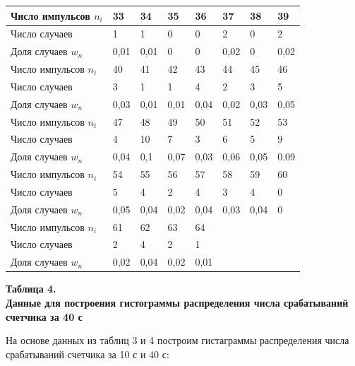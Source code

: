 \begin{table}[H]
    \centering
    \begin{tabular}{|l|l|l|l|l|l|l|l|}
        \hline
        Число импульсов $n_i$ & 33   & 34   & 35   & 36   & 37   & 38   & 39   \\ \hline
        Число случаев         & 1    & 1    & 0    & 0    & 2    & 0    & 2    \\ \hline
        Доля случаев $w_n$    & 0,01 & 0,01 & 0    & 0    & 0,02 & 0    & 0,02 \\ \hline\hline
        Число импульсов $n_i$ & 40   & 41   & 42   & 43   & 44   & 45   & 46   \\ \hline
        Число случаев         & 3    & 1    & 1    & 4    & 2    & 3    & 5    \\ \hline
        Доля случаев $w_n$    & 0,03 & 0,01 & 0,01 & 0,04 & 0,02 & 0,03 & 0,05 \\ \hline\hline
        Число импульсов $n_i$ & 47   & 48   & 49   & 50   & 51   & 52   & 53   \\ \hline
        Число случаев         & 4    & 10   & 7    & 3    & 6    & 5    & 9    \\ \hline
        Доля случаев $w_n$    & 0,04 & 0,1  & 0,07 & 0,03 & 0,06 & 0,05 & 0.09 \\ \hline\hline
        Число импульсов $n_i$ & 54   & 55   & 56   & 57   & 58   & 59   & 60   \\ \hline
        Число случаев         & 5    & 4    & 2    & 4    & 3    & 4    & 0    \\ \hline
        Доля случаев $w_n$    & 0,05 & 0,04 & 0,02 & 0,04 & 0,03 & 0,04 & 0    \\ \hline\hline
        Число импульсов $n_i$ & 61   & 62   & 63   & 64                        \\ \hline
        Число случаев         & 2    & 4    & 2    & 1                         \\ \hline
        Доля случаев $w_n$    & 0,02 & 0,04 & 0,02 & 0,01                      \\ \hline
    \end{tabular}
    \begin{flushright}
        {\scriptsize \textbf{Таблица 4.}\\ \textbf {Данные для построения гистограммы распределения числа срабатываний счетчика за 40 с}}
    \end{flushright}
\end{table}


На основе данных из таблиц 3 и 4 построим гистаграммы распределения числа срабатываний счетчика за 10 с и 40 с:


